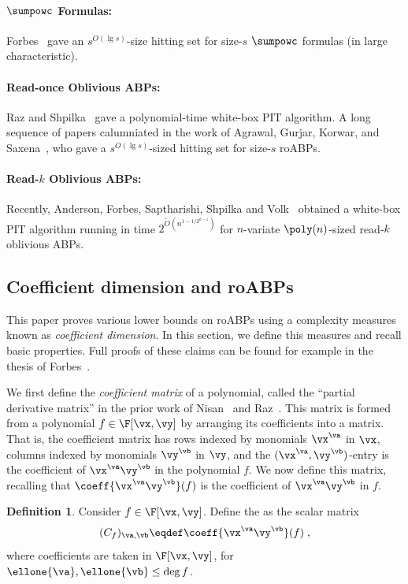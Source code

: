 \documentclass[11pt]{article}
\numberwithin{equation}{section}
\theoremstyle{definition}
\newtheorem{definition}[theorem]{Definition}
\theoremstyle{plain}
\begin{document}
\paragraph{$\sumpowc$ Formulas:} Forbes~\cite{Forbes15} gave an $s^{O(\lg s)}$-size hitting set for size-$s$ $\sumpowc$ formulas (in large characteristic).

\paragraph{Read-once Oblivious ABPs:} Raz and Shpilka~\cite{RazShpilka05} gave a %
polynomial-time   %
white-box PIT algorithm. A long sequence of papers calumniated in the work of Agrawal, Gurjar, Korwar, and Saxena~\cite{AgrawalGKS15}, who gave a $s^{O(\lg s)}$-sized hitting set for size-$s$ roABPs.

\paragraph{Read-$k$ Oblivious ABPs:} Recently, Anderson, Forbes, Saptharishi, Shpilka and Volk~\cite{AndersonFSSV16} obtained a white-box PIT algorithm running in time $2^{\tilde{O}(n^{1-1/2^{k-1}})}$ for $n$-variate $\poly(n)$-sized read-$k$ oblivious ABPs.

\subsection{Coefficient dimension and roABPs}\label{sec:coeff-dim}

This paper proves various lower bounds on roABPs using a complexity measures known as \emph{coefficient dimension}.  In this section, we define this measures and recall basic properties. Full proofs of these claims can be found for example in the thesis of Forbes~\cite{Forbes14}.

We first define the \emph{coefficient matrix} of a polynomial, called the ``partial derivative matrix'' in the prior work of Nisan~\cite{Nisan91} and Raz~\cite{Raz09}. This matrix is formed from a polynomial $f\in\F[\vx,\vy]$ by arranging its coefficients into a matrix.  That is, the coefficient matrix has rows indexed by monomials $\vx^\va$ in $\vx$, columns indexed by monomials $\vy^\vb$ in $\vy$, and the $(\vx^\va,\vy^\vb)$-entry is the coefficient of $\vx^\va\vy^\vb$ in the polynomial $f$.  We now define this matrix, recalling that $\coeff{\vx^\va\vy^\vb}(f)$ is the coefficient of $\vx^\va\vy^\vb$ in $f$.

\begin{definition}
        Consider $f\in\F[\vx,\vy]$.  Define the  as the scalar matrix
        \[
                (C_f)_{\va,\vb}
                \eqdef
                \coeff{\vx^\va\vy^\vb}(f)
                \;,
        \]
        where coefficients are taken in $\F[\vx,\vy]$, for $\ellone{\va},\ellone{\vb}\le \deg f$.
\end{definition}
\end{document}
